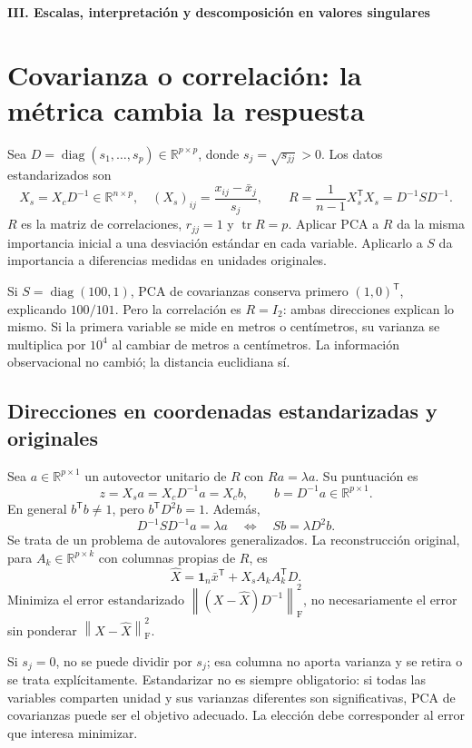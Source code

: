 \documentclass[11pt,a4paper]{article}
\newcommand{\R}{\mathbb R}
\newcommand{\T}{^{\mathsf T}}
\newcommand{\norm}[1]{\left\lVert #1\right\rVert}
\DeclareMathOperator{\tr}{tr}
\DeclareMathOperator{\diag}{diag}
\newcommand{\F}{_{\mathrm F}}
\newcommand{\ones}{\mathbf 1}
\theoremstyle{definition}
\newcommand{\parte}[1]{\par\bigskip\Needspace{8\baselineskip}\begin{center}{\Large\bfseries\color{azul}#1}\end{center}}
\begin{document}
\parte{III. Escalas, interpretación y descomposición en valores singulares}
\section{Covarianza o correlación: la métrica cambia la respuesta}
Sea $D=\diag(s_1,\ldots,s_p)\in\R^{p\times p}$, donde $s_j=\sqrt{s_{jj}}>0$. Los datos estandarizados son
\[
X_s=X_cD^{-1}\in\R^{n\times p},\quad (X_s)_{ij}=\frac{x_{ij}-\bar x_j}{s_j},\qquad
R=\frac1{n-1}X_s\T X_s=D^{-1}SD^{-1}.
\]
$R$ es la matriz de correlaciones, $r_{jj}=1$ y $\tr R=p$. Aplicar PCA a $R$ da la misma importancia inicial a una desviación estándar en cada variable. Aplicarlo a $S$ da importancia a diferencias medidas en unidades originales.
\begin{ejemplo}
Si $S=\diag(100,1)$, PCA de covarianzas conserva primero $(1,0)\T$, explicando $100/101$. Pero la correlación es $R=I_2$: ambas direcciones explican lo mismo. Si la primera variable se mide en metros o centímetros, su varianza se multiplica por $10^4$ al cambiar de metros a centímetros. La información observacional no cambió; la distancia euclidiana sí.
\end{ejemplo}
\subsection{Direcciones en coordenadas estandarizadas y originales}
Sea $a\in\R^{p\times1}$ un autovector unitario de $R$ con $Ra=\lambda a$. Su puntuación es
\[
z=X_sa=X_cD^{-1}a=X_cb,\qquad b=D^{-1}a\in\R^{p\times1}.
\]
En general $b\T b\ne1$, pero $b\T D^2b=1$. Además,
\[
D^{-1}SD^{-1}a=\lambda a\quad\Longleftrightarrow\quad Sb=\lambda D^2b.
\]
Se trata de un problema de autovalores generalizados. La reconstrucción original, para $A_k\in\R^{p\times k}$ con columnas propias de $R$, es
\[
\widehat X=\ones_n\bar x\T+X_sA_kA_k\T D.
\]
Minimiza el error estandarizado $\norm{(X-\widehat X)D^{-1}}\F^2$, no necesariamente el error sin ponderar $\norm{X-\widehat X}\F^2$.
\begin{cuidado}
Si $s_j=0$, no se puede dividir por $s_j$; esa columna no aporta varianza y se retira o se trata explícitamente. Estandarizar no es siempre obligatorio: si todas las variables comparten unidad y sus varianzas diferentes son significativas, PCA de covarianzas puede ser el objetivo adecuado. La elección debe corresponder al error que interesa minimizar.
\end{cuidado}
\end{document}
